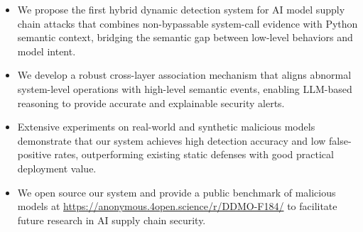 \begin{itemize}
\item We propose the first hybrid dynamic detection system for AI model supply chain attacks that combines non-bypassable system-call evidence with Python semantic context, bridging the semantic gap between low-level behaviors and model intent.
\item We develop a robust cross-layer association mechanism that aligns abnormal system-level operations with high-level semantic events, enabling LLM-based reasoning to provide accurate and explainable security alerts.
\item Extensive experiments on real-world and synthetic malicious models demonstrate that our system achieves high detection accuracy and low false-positive rates, outperforming existing static defenses with good practical deployment value.
\item We open source our system and provide a public benchmark of malicious models at \url{https://anonymous.4open.science/r/DDMO-F184/} to facilitate future research in AI supply chain security.
\end{itemize}

